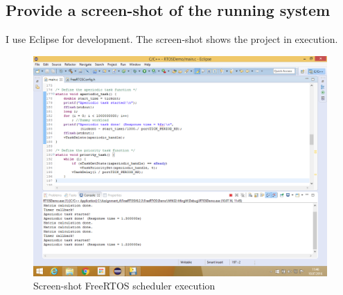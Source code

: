 \documentclass[a4paper]{article}
\begin{document}
\subsection{Provide a screen-shot of the running system}

I use Eclipse for development. The screen-shot shows the project in execution.\\

\begin{figure}[!ht]
\begin{center}
\includegraphics[width=\textwidth]{Assignment_4.png}
\caption{Screen-shot FreeRTOS scheduler execution}
\end{center}
\end{figure}
\end{document}

